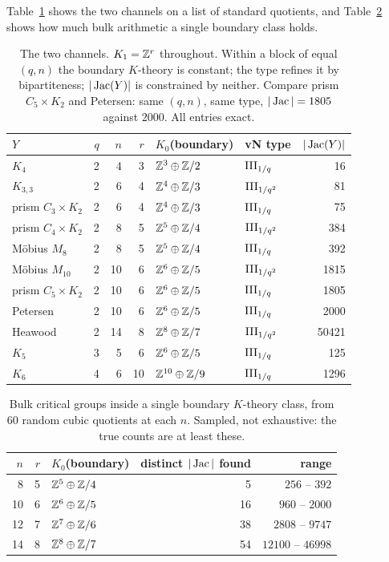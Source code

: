 Table~\ref{Holo1:tab:named} shows the two channels on a list of standard quotients, and
Table~\ref{Holo1:tab:spread} shows how much bulk arithmetic a single boundary class holds.

\begin{table}[ht]
\centering\small
\begin{tabular}{lrrrllr}
\toprule
$Y$ & $q$ & $n$ & $r$ & $K_0$(boundary) & vN type & $|\operatorname{Jac}(Y)|$\\
\midrule
$K_4$            & 2 &  4 &  3 & $\mathbb{Z}^3\oplus\mathbb{Z}/2$    & $\mathrm{III}_{1/q}$   & 16\\
$K_{3,3}$        & 2 &  6 &  4 & $\mathbb{Z}^4\oplus\mathbb{Z}/3$    & $\mathrm{III}_{1/q^2}$ & 81\\
prism $C_3\times K_2$ & 2 & 6 & 4 & $\mathbb{Z}^4\oplus\mathbb{Z}/3$ & $\mathrm{III}_{1/q}$   & 75\\
prism $C_4\times K_2$ & 2 & 8 & 5 & $\mathbb{Z}^5\oplus\mathbb{Z}/4$ & $\mathrm{III}_{1/q^2}$ & 384\\
M\"obius $M_8$   & 2 &  8 &  5 & $\mathbb{Z}^5\oplus\mathbb{Z}/4$    & $\mathrm{III}_{1/q}$   & 392\\
M\"obius $M_{10}$& 2 & 10 &  6 & $\mathbb{Z}^6\oplus\mathbb{Z}/5$    & $\mathrm{III}_{1/q^2}$ & 1815\\
prism $C_5\times K_2$ & 2 & 10 & 6 & $\mathbb{Z}^6\oplus\mathbb{Z}/5$ & $\mathrm{III}_{1/q}$  & 1805\\
Petersen         & 2 & 10 &  6 & $\mathbb{Z}^6\oplus\mathbb{Z}/5$    & $\mathrm{III}_{1/q}$   & 2000\\
Heawood          & 2 & 14 &  8 & $\mathbb{Z}^8\oplus\mathbb{Z}/7$    & $\mathrm{III}_{1/q^2}$ & 50421\\
$K_5$            & 3 &  5 &  6 & $\mathbb{Z}^6\oplus\mathbb{Z}/5$    & $\mathrm{III}_{1/q}$   & 125\\
$K_6$            & 4 &  6 & 10 & $\mathbb{Z}^{10}\oplus\mathbb{Z}/9$ & $\mathrm{III}_{1/q}$   & 1296\\
\bottomrule
\end{tabular}
\caption{The two channels. $K_1=\mathbb{Z}^r$ throughout. Within a block of equal $(q,n)$ the
boundary $K$-theory is constant; the type refines it by bipartiteness; $|\operatorname{Jac}(Y)|$ is
constrained by neither. Compare prism $C_5\times K_2$ and Petersen: same $(q,n)$, same
type, $|\operatorname{Jac}|=1805$ against $2000$. All entries exact.}
\label{Holo1:tab:named}
\end{table}

\begin{table}[ht]
\centering\small
\begin{tabular}{rrlrr}
\toprule
$n$ & $r$ & $K_0$(boundary) & distinct $|\operatorname{Jac}|$ found & range\\
\midrule
 8 & 5 & $\mathbb{Z}^{5}\oplus\mathbb{Z}/4$ &  5 & $256$ -- $392$\\
10 & 6 & $\mathbb{Z}^{6}\oplus\mathbb{Z}/5$ & 16 & $960$ -- $2000$\\
12 & 7 & $\mathbb{Z}^{7}\oplus\mathbb{Z}/6$ & 38 & $2808$ -- $9747$\\
14 & 8 & $\mathbb{Z}^{8}\oplus\mathbb{Z}/7$ & 54 & $12100$ -- $46998$\\
\bottomrule
\end{tabular}
\caption{Bulk critical groups inside a single boundary $K$-theory class, from $60$ random
cubic quotients at each $n$. Sampled, not exhaustive: the true counts are at least these.}
\label{Holo1:tab:spread}
\end{table}

